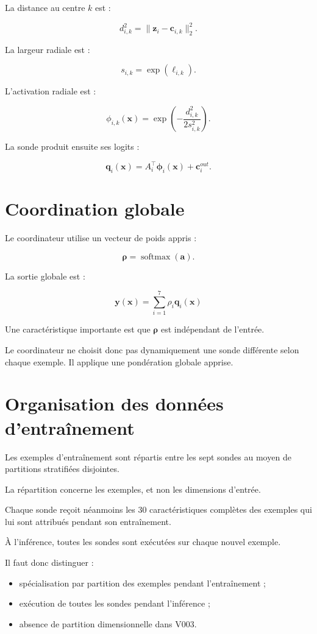 \documentclass[11pt,a4paper]{report}
\newcommand{\softmax}{\operatorname{softmax}}
\newcommand{\vect}[1]{\bm{#1}}
\begin{document}
La distance au centre \(k\) est :

\[
d_{i,k}^{2}
=
\|\vect{z}_i-\vect{c}_{i,k}\|_2^2.
\]

La largeur radiale est :

\[
s_{i,k}=\exp(\ell_{i,k}).
\]

L'activation radiale est :

\[
\phi_{i,k}(\vect{x})
=
\exp\left(
-\frac{d_{i,k}^{2}}{2s_{i,k}^{2}}
\right).
\]

La sonde produit ensuite ses logits :

\[
\vect{q}_i(\vect{x})
=
A_i^\top\vect{\phi}_i(\vect{x})
+\vect{c}_i^{out}.
\]

\section{Coordination globale}

Le coordinateur utilise un vecteur de poids appris :

\[
\vect{\rho}
=
\softmax(\vect{a}).
\]

La sortie globale est :

\[
\boxed{
\vect{y}(\vect{x})
=
\sum_{i=1}^{7}
\rho_i\vect{q}_i(\vect{x})
}
\]

Une caractéristique importante est que \(\vect{\rho}\)
est indépendant de l'entrée.

Le coordinateur ne choisit donc pas dynamiquement une sonde
différente selon chaque exemple. Il applique une pondération
globale apprise.

\section{Organisation des données d'entraînement}

Les exemples d'entraînement sont répartis entre les sept
sondes au moyen de partitions stratifiées disjointes.

La répartition concerne les exemples, et non les dimensions
d'entrée.

Chaque sonde reçoit néanmoins les 30 caractéristiques
complètes des exemples qui lui sont attribués pendant
son entraînement.

À l'inférence, toutes les sondes sont exécutées sur chaque
nouvel exemple.

Il faut donc distinguer :

\begin{itemize}
  \item spécialisation par partition des exemples
  pendant l'entraînement ;
  \item exécution de toutes les sondes pendant l'inférence ;
  \item absence de partition dimensionnelle dans V003.
\end{itemize}
\end{document}
